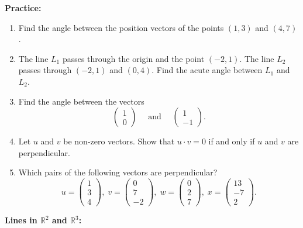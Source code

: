 \documentclass{article}
\begin{document}
\textbf{Practice:}\bigskip

\begin{enumerate}
	\item Find the angle between the position vectors of the points $(1,3)$ and $(4,7)$.
	\item The line $L_1$ passes through the origin and the point $(-2,1)$. The line $L_2$ passes through $(-2,1)$ and $(0,4)$. Find the acute angle between $L_1$ and $L_2$.
	\item Find the angle between the vectors
		\[\left(\begin{array}{c}1\\0\end{array}\right)\quad \mbox{ and } \quad \left(\begin{array}{c}1\\-1\end{array}\right).\]
	\item Let $u$ and $v$ be non-zero vectors. Show that $u\cdot v=0$ if and only if $u$ and $v$ are perpendicular.
	\item Which pairs of the following vectors are perpendicular?
		\[u=\left(\begin{array}{c} 1\\3\\4\end{array}\right),\;v=\left(\begin{array}{c} 0\\7\\-2\end{array}\right),\;w=\left(\begin{array}{c} 0\\2\\7\end{array}\right),\;x=\left(\begin{array}{c} 13\\-7\\2\end{array}\right).\]
\end{enumerate}








\clearpage










\textbf{Lines in $\mathbb{R}^2$ and $\mathbb{R}^3$:}\bigskip
\end{document}
